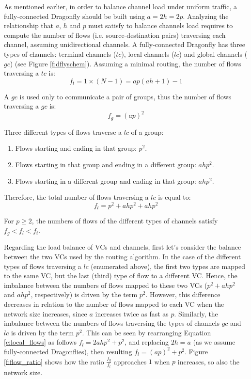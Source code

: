 \documentclass[review]{elsarticle}
\newcommand{\dflys}{Dragonflies}
\newcommand{\dfly}{Dragonfly}
\begin{document}
As mentioned earlier, in order to balance channel load under uniform traffic, a fully-connected \dfly{} should be built using $a = 2h = 2p$.
Analyzing the relationship that $a$, $h$ and $p$ must satisfy to balance channels load requires to compute the number of flows (i.e. source-destination pairs) traversing each channel, assuming unidirectional channels.
A fully-connected \dfly{} has three types of channels: terminal channels ($tc$), local channels ($lc$) and global channels ($gc$) (see Figure \ref{f:dflyschem}).
Assuming a minimal routing, the number of flows traversing a $tc$ is: 
\begin{equation}
 f_t = 1 \times (N - 1) = ap(ah + 1) - 1
\end{equation}

A $gc$ is used only to communicate a pair of groups,
thus the number of flows traversing a $gc$ is:
\begin{equation}
f_g = (ap)^2
\label{e:global_flows}
\end{equation}


Three different types of flows traverse a $lc$ of a group:
\begin{enumerate}
\item Flows starting and ending in that group: $p^2$.
\item Flows starting in that group and ending in a different group: $ahp^2$.
\item Flows starting in a different group and ending in that group: $ahp^2$.
\end{enumerate}

Therefore, the total number of flows traversing a $lc$ is equal to:
\begin{equation}
f_l = p^2 + ahp^2 + ahp^2
\label{e:local_flows}
\end{equation}

For $p \ge 2$, the numbers of flows of the different types of channels satisfy $f_g < f_l < f_t$.

Regarding the load balance of VCs and channels, first let's consider the balance between the two VCs used by the routing algorithm.
In the case of the different types of flows traversing a $lc$ (enumerated above), the first two types are mapped to the same VC, but the last (third) type of flow to a different VC.
Hence, the imbalance between the numbers of flows mapped to these two VCs ($p^2 + ahp^2$ and $ahp^2$, respectively) is driven by the term $p^2$. However,
this difference decreases in relation to the number of flows mapped to each VC when the network size increases, since $a$ increases twice as fast as $p$.
Similarly, the imbalance between the numbers of flows traversing the types of channels $gc$ and $lc$ is driven by the term $p^2$. This can be seen by rearranging Equation \ref{e:local_flows}
as follows  $ f_l = 2ahp^2 + p^2$, and replacing $2h = a$ (as we assume fully-connected \dflys{}), then resulting $ f_l = (ap)^2 + p^2$.
Figure \ref{f:flow_ratio} shows how the ratio $\frac{f_g}{f_l}$ approaches $1$ when $p$ increases, so also the network size.
\end{document}
